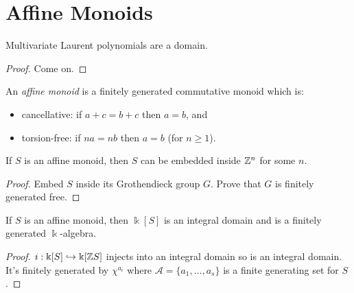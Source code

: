 \section{Affine Monoids}


\begin{lemma}
  \label{0-mv-laurent-poly-domain}
  \uses{}
  \leanok

  Multivariate Laurent polynomials are a domain.
\end{lemma}
\begin{proof}
  \uses{}

  Come on.
\end{proof}


\begin{definition}
  \label{0-aff-mon}
  \leanok

  An \emph{affine monoid} is a finitely generated commutative monoid which is:
  \begin{itemize}
    \item cancellative: if $a + c = b + c$ then $a = b$, and
    \item torsion-free: if $n a = n b$ then $a = b$ (for $n \geq 1$).
  \end{itemize}
\end{definition}


\begin{proposition}
  \label{0-embed-aff-mon}
  \leanok

  If $S$ is an affine monoid, then $S$ can be embedded inside ${\mathbb Z}^n$ for some $n$.
\end{proposition}
\begin{proof}
  \uses{}
  \leanok

  Embed $S$ inside its Grothendieck group $G$. Prove that $G$ is finitely generated free.
\end{proof}


\begin{proposition}
  \label{0-aff-mon-alg-domain}
  \leanok

  If $S$ is an affine monoid, then $\Bbbk[S]$ is an integral domain and is a finitely generated $\Bbbk$-algebra.
\end{proposition}
\begin{proof}
  \leanok

  $i : \Bbbk[S] \hookrightarrow \Bbbk[{\mathbb Z} S]$ injects into an integral domain so is an integral domain. It's finitely generated by $\chi^{a_i}$ where $\mathcal A = \{a_1, \dotsc, a_s\}$ is a finite generating set for $S$.
\end{proof}


